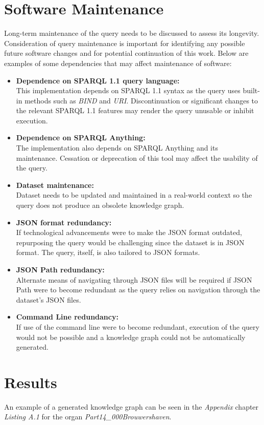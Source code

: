 \section{Software Maintenance}
\hspace{0.5cm} Long-term maintenance of the query needs to be discussed to assess its longevity. Consideration of query maintenance is important for identifying any possible future software changes and for potential continuation of this work. Below are examples of some dependencies that may affect maintenance of software:  

\begin{itemize}
    \item \textbf{Dependence on SPARQL 1.1 query language:} \\ This implementation depends on SPARQL 1.1 syntax as the query uses built-in methods such as \textit{BIND} and \textit{URI}. Discontinuation or significant changes to the relevant SPARQL 1.1 features may render the query unusable or inhibit execution.
    \item \textbf{Dependence on SPARQL Anything:} \\ The implementation also depends on SPARQL Anything and its maintenance. Cessation or deprecation of this tool may affect the usability of the query. 
    \item \textbf{Dataset maintenance:} \\ Dataset needs to be updated and maintained in a real-world context so the query does not produce an obsolete knowledge graph. 
    \item \textbf{JSON format redundancy:} \\ If technological advancements were to make the JSON format outdated, repurposing the query would be challenging since the dataset is in JSON format. The query, itself, is also tailored to JSON formats.
    \item \textbf{JSON Path redundancy:} \\ Alternate means of navigating through JSON files will be required if JSON Path were to become redundant as the query relies on navigation through the dataset's JSON files.
    \item \textbf{Command Line redundancy:} \\ If use of the command line were to become redundant, execution of the query would not be possible and a knowledge graph could not be automatically generated. 
\end{itemize}

\section{Results}
\hspace{0.5cm} An example of a generated knowledge graph can be seen in the \textit{Appendix} chapter \textit{Listing A.1} for the organ \textit{Part14\_000Brouwershaven}. 